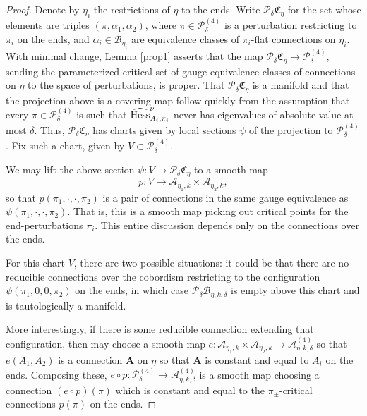 \documentclass[10pt,a4paper]{amsart}
\theoremstyle{definition}
\theoremstyle{remark}
\numberwithin{figure}{qchap}
\begin{document}
\begin{proof}Denote by $\eta_i$ the restrictions of $\eta$ to the ends. Write $\mathcal P_\delta \mathfrak C_\eta$ for the set whose elements are triples $(\pi, \alpha_1, \alpha_2)$, where $\pi \in \mathcal P^{(4)}_\delta$ is a perturbation restricting to $\pi_i$ on the ends, and $\alpha_i \in \mathcal B_{\eta_i}$ are equivalence classes of $\pi_i$-flat connections on $\eta_i$. With minimal change, Lemma \ref{prop1} asserts that the map $\mathcal P_{\delta} \mathfrak C_\eta \to \mathcal P^{(4)}_{\delta}$, sending the parameterized critical set of gauge equivalence classes of connections on $\eta$ to the space of perturbations, is proper. That $\mathcal P_{\delta} \mathfrak C_\eta$ is a manifold and that the projection above is a covering map follow quickly from the assumption that every $\pi \in \mathcal P^{(4)}_{\delta}$ is such that $\widehat{\textup{Hess}}^\nu_{A_i, \pi_i}$ never has eigenvalues of absolute value at most $\delta$. Thus, $\mathcal P_{\delta} \mathfrak C_\eta$ has charts given by local sections $\psi$ of the projection to $\mathcal P^{(4)}_{\delta}$. Fix such a chart, given by $V \subset \mathcal P^{(4)}_{\delta}$.

We may lift the above section $\psi: V \to \mathcal P_{\delta} \mathfrak C_\eta$ to a smooth map
$$p: V \to \mathcal A_{\eta_1, k} \times \mathcal A_{\eta_2, k},$$
so that $p(\pi_1, \cdot, \cdot, \pi_2)$ is a pair of connections in the same gauge equivalence as $\psi(\pi_1, \cdot, \cdot, \pi_2)$. That is, this is a smooth map picking out critical points for the end-perturbations $\pi_i$. This entire discussion depends only on the connections over the ends.

For this chart $V$, there are two possible situations: it could be that there are no reducible connections over the cobordism restricting to the configuration $\psi(\pi_1, 0, 0, \pi_2)$ on the ends, in which case $\mathcal P_{\delta} \mathcal B_{\eta, k, \delta}$ is empty above this chart and is tautologically a manifold.

More interestingly, if there is some reducible connection extending that configuration, then may choose a smooth map $e: \mathcal A_{\eta_1, k} \times \mathcal A_{\eta_2, k} \to \mathcal A^{(4)}_{\eta, k,\delta}$ so that $e(A_1, A_2)$ is a connection $\mathbf{A}$ on $\eta$ so that $\mathbf{A}$ is constant and equal to $A_i$ on the ends. Composing these, $e \circ p: \mathcal P^{(4)}_{\delta} \to \mathcal A^{(4)}_{\eta, k, \delta}$ is a smooth map choosing a connection $(e\circ p)(\pi)$ which is constant and equal to the $\pi_\pm$-critical connections $p(\pi)$ on the ends.


\end{proof}
\end{document}
